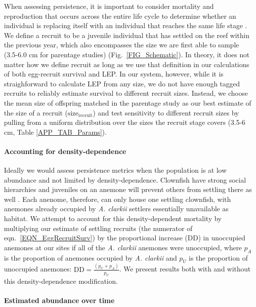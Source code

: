 \documentclass[12pt, oneside]{article}   	%
\begin{document}
When assessing persistence, it is important to consider mortality and reproduction that occurs across the entire life cycle to determine whether an individual is replacing itself with an individual that reaches the same life stage \citep{burgess2014beyond}. We define a recruit to be a juvenile individual that has settled on the reef within the previous year, which also encompasses the size we are first able to sample (3.5-6.0 cm for parentage studies) (Fig.\ \ref{FIG_Schematic}). In theory, it does not matter how we define recruit as long as we use that definition in our calculations of both egg-recruit survival and LEP. In our system, however, while it is straighforward to calculate LEP from any size, we do not have enough tagged recruits to reliably estimate survival to different recruit sizes. Instead, we choose the mean size of offspring matched in the parentage study as our best estimate of the size of a recruit ($\text{size}_\text{recruit}$) and test sensitivity to different recruit sizes by pulling from a uniform distribution over the sizes the recruit stage covers (3.5-6 cm, Table \ref{APP_TAB_Params}).

\paragraph*{Accounting for density-dependence}  %

Ideally we would assess persistence metrics when the population is at low abundance and not limited by density-dependence. Clownfish have strong social hierarchies and juveniles on an anemone will prevent others from settling there as well \citep[seen in \textit{A. percula,}][]{buston2003forcible}. Each anenome, therefore, can only house one settling clownfish, with anemones already occupied by \textit{A. clarkii} settlers essentially unavailable as habitat. We attempt to account for this density-dependent mortality by multiplying our estimate of settling recruits (the numerator of eqn.\ \ref{EQN_EggRecruitSurv}) by the proportional increase ($\text{DD}$) in unoccupied anemones at our sites if all of the \textit{A. clarkii} anemones were unoccupied, where $p_A$ is the proportion of anemones occupied by \textit{A. clarkii} and $p_U$ is the proportion of unoccupied anemones: $\text{DD} = \frac{(p_U + p_A)}{p_U}$. We present results both with and without this density-dependence modification.

\paragraph*{Estimated abundance over time}
\end{document}
